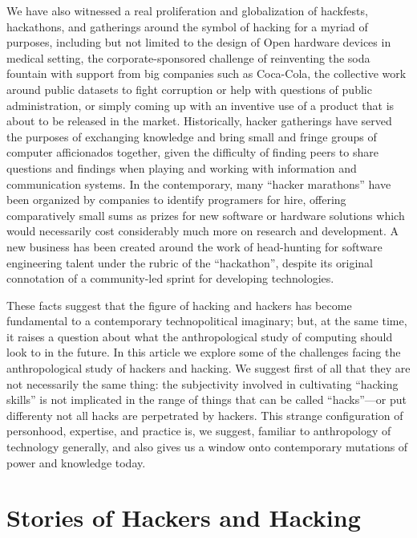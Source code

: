 \documentclass[10pt,letter,oneside]{scrartcl}
\begin{document}
We have also witnessed a real proliferation and globalization of hackfests, 
hackathons, and gatherings around the symbol of hacking for a myriad of purposes,
including but not limited to the design of Open hardware devices in medical 
setting, the corporate-sponsored challenge of reinventing the soda fountain 
with support from big companies such as Coca-Cola, the collective work around 
public datasets to fight corruption or help with questions of public administration,
or simply coming up with an inventive use of a product that is about to be released
in the market.  Historically, hacker gatherings have served the purposes of exchanging 
knowledge and bring small and fringe groups of computer afficionados together, given 
the difficulty of finding peers to share questions and findings when playing and working
with information and communication systems.  In the contemporary, many ``hacker 
marathons'' have been organized by companies to identify programers for hire, offering 
comparatively small sums as prizes for new software or hardware solutions which would
necessarily cost considerably much more on research and development.  A new business 
has been created around the work of head-hunting for software engineering talent under
the rubric of the ``hackathon'', despite its original connotation of a community-led
sprint for developing technologies.

These facts suggest that the figure of hacking and hackers has become
fundamental to a contemporary technopolitical imaginary; but, at the same time, 
it raises a question about what the anthropological study of computing should 
look to in the future.  In this article we explore some of the challenges facing the
anthropological study of hackers and hacking.  We suggest first of all that they
are not necessarily the same thing:  the subjectivity involved in cultivating 
``hacking skills'' is not implicated in the range of things that can be called
``hacks''---or put differenty not all hacks are perpetrated by hackers.  This 
strange configuration of personhood, expertise, and practice is, we suggest, 
familiar to  anthropology of technology generally, and also gives us a window 
onto contemporary mutations of power and knowledge today.

\section*{Stories of Hackers and Hacking}
\end{document}
